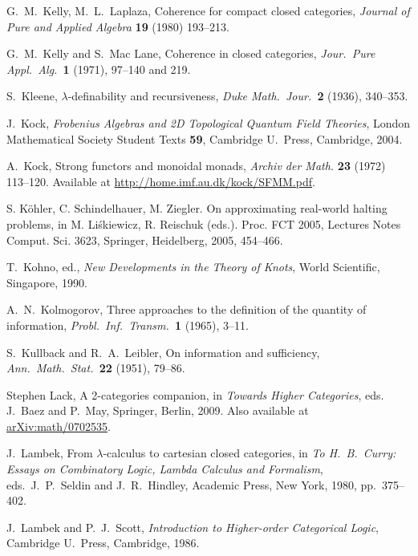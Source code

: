 \documentclass[12pt,twoside,openright]{report}
\begin{document}
\begin{thebibliography}{99}
 G.\ M.\ Kelly, M.\ L.\ Laplaza, Coherence for compact closed categories, \textsl{Journal of Pure and Applied Algebra} \textbf{19} (1980) 193--213.

 G.\ M.\ Kelly and S.\ Mac Lane, Coherence in closed categories, {\sl Jour.\ Pure Appl.\ Alg.\ }{\bf 1} (1971), 97--140
and 219.

S.\ Kleene, $\lambda$-definability and recursiveness,
{\sl Duke Math.\ Jour.\ }{\bf 2} (1936), 340--353. 

J.\ Kock, \textsl{Frobenius Algebras and 2{D} Topological Quantum Field Theories}, London Mathematical Society Student Texts \textbf{59}, Cambridge U.\ Press, Cambridge, 2004.

 A.\ Kock, Strong functors and monoidal monads, \textsl{Archiv der Math.} \textbf{23} (1972) 113--120.  Available at \href{http://home.imf.au.dk/kock/SFMM.pdf}{http://home.imf.au.dk/kock/SFMM.pdf}.

  S. K\"ohler, C. Schindelhauer, M. Ziegler. On approximating real-world halting problems, in M. Li\'skiewicz, R. Reischuk (eds.). Proc. FCT 2005, Lectures Notes Comput. Sci. 3623, Springer, Heidelberg, 2005, 454--466.

T.\ Kohno, ed., \textsl{New Developments in the Theory of Knots}, World Scientific, Singapore, 1990.

 A.\ N.\ Kolmogorov, Three approaches to the definition of the quantity of information, 
{\sl Probl.\ Inf.\ Transm.\ }\textbf{1} (1965), 3--11.

 S.\ Kullback and R.\ A.\ Leibler, On information and sufficiency, \textsl{Ann.\ Math.\ Stat.\ }\textbf{22}
(1951), 79--86.

 Stephen Lack, A 2-categories companion, in \textsl{Towards Higher Categories}, eds. J.\ Baez and P.\ May, Springer, Berlin, 2009.  Also available at \href{http://arxiv.org/abs/math/0702535}{arXiv:math/0702535}.

 J.\ Lambek, From $\lambda$-calculus to cartesian closed categories, in {\sl To H.\ B.\ Curry: Essays on Combinatory Logic, Lambda Calculus and Formalism}, eds.\ J.\ P.\ Seldin and J.\
R.\ Hindley, Academic Press, New York, 1980, pp.\ 375--402. 

 J.\ Lambek and P.\ J.\ Scott, {\sl Introduction to Higher-order Categorical Logic}, Cambridge U.\ Press, Cambridge,
1986.  


\end{thebibliography}
\end{document}
